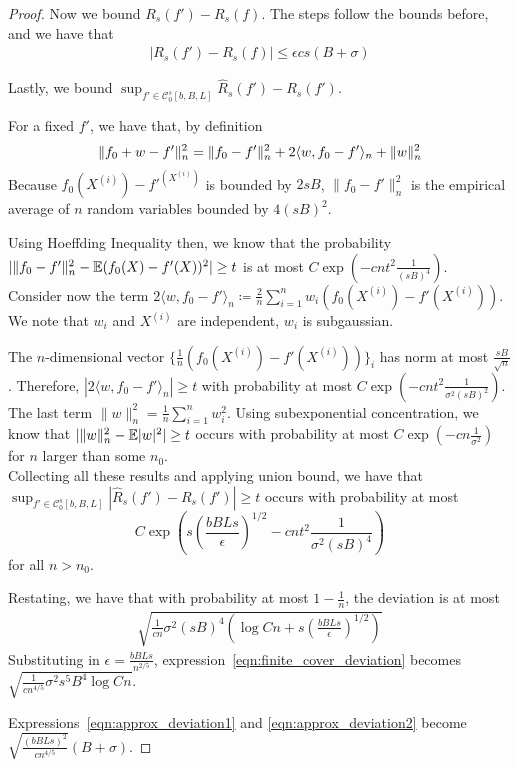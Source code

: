 \documentclass{article}
\begin{document}
\begin{proof}
Now we bound $R_s(f') - R_s(f)$. The steps follow the bounds before, and we have that 
\begin{align}
|R_s(f') - R_s(f)| \leq \epsilon cs(B + \sigma) \label{eqn:approx_deviation2}
\end{align}

Lastly, we bound $\sup_{f' \in \mathcal{C}_0^s[b,B,L]} \hat{R}_s(f') - R_s(f')$. 

For a fixed $f'$, we have that, by definition
\[
\| f_0 + w - f' \|_n^2 = \| f_0 - f'\|_n^2 + 2 \langle w, f_0 - f'\rangle_n + \| w \|_n^2 \\
\]
Because $f_0(X^{(i)}) - f'^(X^{(i)})$ is bounded by $2sB$, $\| f_0 - f'\|_n^2$ is the empirical average of $n$ random variables bounded by $4(sB)^2$. 

Using Hoeffding Inequality then, we know that the probability $| \| f_0 - f' \|_n^2 - \mathbb{E}(f_0(X) - f '(X))^2 | \geq t $ is at most $C \exp( - c n t^2 \frac{1}{(sB)^4})$. \\

Consider now the term $2 \langle w, f_0 - f' \rangle_n \coloneqq \frac{2}{n} \sum_{i=1}^n w_i ( f_0(X^{(i)}) - f'(X^{(i)}))$. We note that $w_i$ and $X^{(i)}$ are independent, $w_i$ is subgaussian. 

The $n$-dimensional vector $\{ \frac{1}{n} ( f_0(X^{(i)}) - f'(X^{(i)})) \}_i$ has norm at most $\frac{sB}{\sqrt{n}}$. Therefore, $|2 \langle w, f_0 - f' \rangle_n | \geq t$ with probability at most $C \exp( - c n t^2 \frac{1}{\sigma^2(sB)^2})$. \\

The last term $\| w \|_n^2 = \frac{1}{n} \sum_{i=1}^n w_i^2$. Using subexponential concentration, we know that $ |\| w \|_n^2 - \mathbb{E}|w|^2 | \geq t$ occurs with probability at most $C \exp( - c n \frac{1}{\sigma^2} )$ for $n$ larger than some $n_0$.\\

Collecting all these results and applying union bound, we have that $\sup_{f' \in \mathcal{C}_0^s[b,B,L]} | \hat{R}_s(f') - R_s(f') | \geq t$ occurs with probability at most
\[
C \exp( s\left( \frac{bBLs}{\epsilon} \right)^{1/2} - c n t^2 \frac{1}{\sigma^2 (sB)^4} )
\]
for all $n > n_0$.

Restating, we have that with probability at most $1- \frac{1}{n}$, the deviation is at most 
\begin{align}
\sqrt{ \frac{1}{cn} \sigma^2 (sB)^4 \left( \log Cn + s( \frac{bBLs}{\epsilon})^{1/2} \right)} \label{eqn:finite_cover_deviation}
\end{align}
Substituting in $\epsilon = \frac{bBLs}{n^{2/5}}$, expression~\ref{eqn:finite_cover_deviation} becomes $\sqrt{ \frac{1}{cn^{4/5}} \sigma^2 s^5 B^4 \log Cn}$.

Expressions~\ref{eqn:approx_deviation1} and \ref{eqn:approx_deviation2} become $\sqrt{ \frac{(bBLs)^2}{cn^{4/5}}} (B+\sigma)$.

\end{proof}
\end{document}
